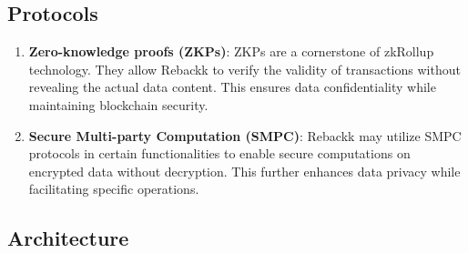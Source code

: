 \documentclass[12pt]{article}
\begin{document}
\subsection{Protocols}
\begin{enumerate}
    \item \textbf{Zero-knowledge proofs (ZKPs)}: ZKPs are a cornerstone of zkRollup technology. They allow Rebackk to verify the validity of transactions without revealing the actual data content. This ensures data confidentiality while maintaining blockchain security.
    \item \textbf{Secure Multi-party Computation (SMPC)}: Rebackk may utilize SMPC protocols in certain functionalities to enable secure computations on encrypted data without decryption. This further enhances data privacy while facilitating specific operations.
\end{enumerate}

\subsection{Architecture}
\label{fig:architecture}
\end{document}
